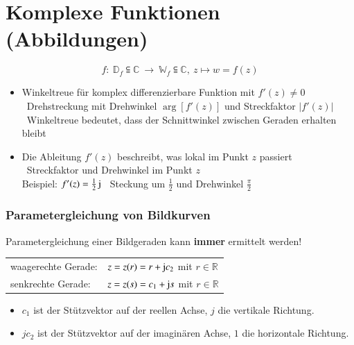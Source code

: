 \section{Komplexe Funktionen (Abbildungen)}

\vspace{-0.2cm}

$$ f: \: \mathbb{D}_f \subseteqq \mathbb{C}  \: \rightarrow \: \mathbb{W}_f \subseteqq  \mathbb{C}, \: z  \mapsto w = f(z) $$

\begin{itemize}[itemsep=0.2cm]
    \item Winkeltreue für komplex differenzierbare Funktion mit $f'(z) \neq 0$ \\
          \textrightarrow\ Drehstreckung mit Drehwinkel $\arg[f'(z)]$ und Streckfaktor $\vert f'(z) \vert$\\
          \textrightarrow\ Winkeltreue bedeutet, dass der Schnittwinkel zwischen Geraden erhalten bleibt
    \item Die Ableitung $f'(z)$ beschreibt, was lokal im Punkt $z$ passiert \\
          \textrightarrow\ Streckfaktor und Drehwinkel im Punkt $z$ \\
          Beispiel: $f'(z) = \frac{1}{2}\mathop{} \! \mathrm{j}$ \quad \textrightarrow\ Steckung um $\frac{1}{2}$ und Drehwinkel $\frac{\pi}{2}$
\end{itemize}



\subsubsection{Parametergleichung von Bildkurven}

Parametergleichung einer Bildgeraden kann \textbf{immer} ermittelt werden! \smallskip

\begin{tabular}{ll}
    waagerechte Gerade: & $z = z(r) = r + \mathop{} \! \mathrm{j} c_2$ \quad mit $r \in \mathbb{R}$ \\
    senkrechte Gerade:  & $z = z(s) = c_1 + \mathop{} \! \mathrm{j} s$ \quad mit $r \in \mathbb{R}$
\end{tabular}\vspace{1em}

\begin{itemize}
    \item $c_1$ ist der Stützvektor auf der reellen Achse, $j$ die vertikale Richtung.
    \item $j c_2$ ist der Stützvektor auf der imaginären Achse, $1$ die horizontale Richtung.
\end{itemize}


